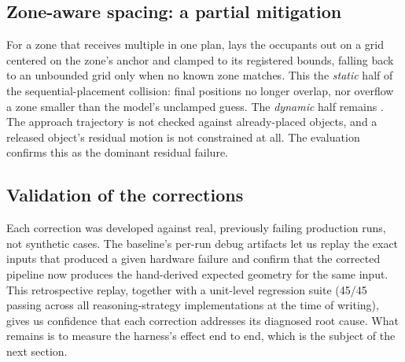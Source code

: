 \subsection{Zone-aware spacing: a partial mitigation}
\label{sec:zone-spacing}

For a zone that receives multiple  in one plan,
\harness{} lays the occupants out on a grid centered on the zone's
anchor and clamped to its registered bounds, falling back to an
unbounded grid only when no known zone matches. This 
the \emph{static} half of the sequential-placement collision: final
positions no longer overlap, nor overflow a zone smaller than the
model's unclamped guess. The \emph{dynamic} half remains
. The approach trajectory is not checked against
already-placed objects, and a released object's residual motion is not
constrained at all. The evaluation confirms this as the dominant
residual failure.

\subsection{Validation of the corrections}
\label{sec:validation}

Each correction was developed against real, previously failing
production runs, not synthetic cases. The baseline's per-run debug
artifacts let us replay the exact inputs that produced a given
hardware failure and confirm that the corrected pipeline now produces
the hand-derived expected geometry for the same input. This
retrospective replay, together with a unit-level regression suite
(45/45 passing across all reasoning-strategy implementations at the
time of writing), gives us confidence that each correction addresses
its diagnosed root cause. What remains is to measure the harness's
effect end to end, which is the subject of the next section.
